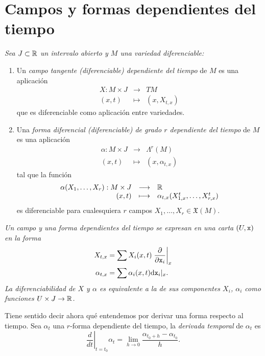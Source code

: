 \section{Campos y formas dependientes del tiempo} \label{sec:tiempo}

  \begin{defn} \leavevmode
    \em 
    Sea $ J\subset \mathbb{R} $ un intervalo abierto y $ M $ una variedad diferenciable:
    \begin{enumerate}
      \item Un \emph{campo tangente (diferenciable) dependiente del tiempo} de $M$ es una aplicación \[\begin{array}{rcl}X:M\times J & \longrightarrow & TM \\ (x,t) & \longmapsto & (x,X_{t,x}) \end{array} \] que es diferenciable como aplicación entre variedades. 
      \item Una \emph{forma diferencial (diferenciable) de grado $r$ dependiente del tiempo} de $M$ es una aplicación \[\begin{array}{rcl} \alpha: M \times J & \longrightarrow & \Lambda^r(M) \\ (x,t) &  \longmapsto & (x,\alpha_{t,x}) \end{array}\] tal que la función \[\begin{array}{rcl} \alpha(X_1,\dots,X_r):M\times J & \longrightarrow & \mathbb{R} \\ (x,t) & \longmapsto & \alpha_{t,x}(X_{1,x}^t,\dots,X_{r,x}^t)\end{array}\] es diferenciable para cualesquiera $r$ campos $X_1,\dots,X_r \in \mathfrak{X}(M)$.
    \end{enumerate}
  \end{defn}

  \begin{obs}
    \em
    Un campo y una forma dependientes del tiempo se expresan en una carta $(U,\mathtt{x})$ en la forma
    \begin{align*}
      X_{t,x} &= \sum X_i(x,t) \left.\frac{\partial}{\partial \mathtt{x}_i}\right|_x \\
      \alpha_{t,x} &= \sum \alpha_i(x,t) \mathrm{d} \mathtt{x}_i |_x.
    \end{align*}
    La diferenciabilidad de $X$ y $\alpha$ es equivalente a la de sus componentes $X_i$, $\alpha_i$ como funciones $U\times J \rightarrow \mathbb{R}$.
  \end{obs}
  Tiene sentido decir ahora qué entendemos por derivar una forma respecto al tiempo. Sea $\alpha_t$ una $r$-forma dependiente del tiempo, la \emph{derivada temporal} de $\alpha_t$ es
    \begin{equation*}
      \left. \frac{d}{dt}\right|_{t=t_0} \alpha_t = \lim_{h\rightarrow 0}\frac{\alpha_{t_0+h}-\alpha_{t_0}}{h}.
    \end{equation*}

